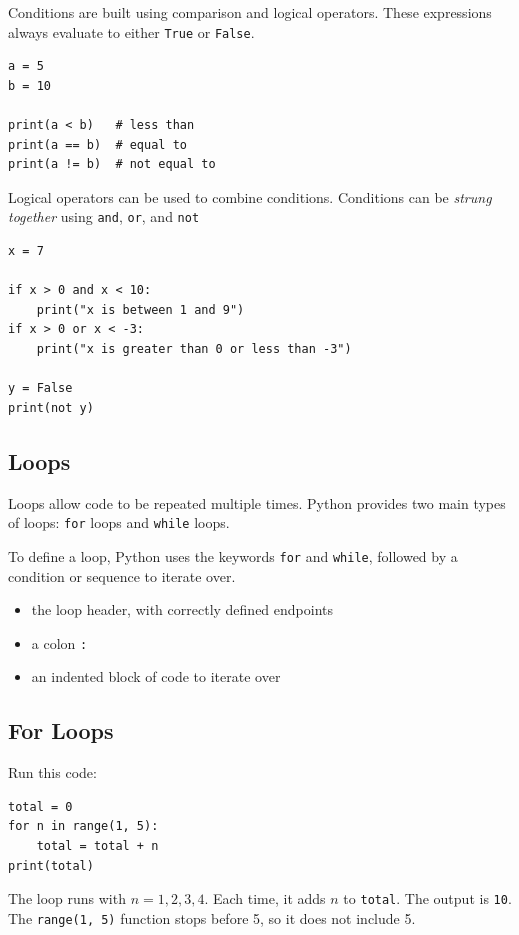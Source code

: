 Conditions are built using comparison and logical operators. These expressions
always evaluate to either \texttt{True} or \texttt{False}.

\begin{verbatim}
a = 5
b = 10

print(a < b)   # less than
print(a == b)  # equal to
print(a != b)  # not equal to
\end{verbatim}

Logical operators can be used to combine conditions. Conditions can be \emph{strung together} using \texttt{and}, \texttt{or}, and \texttt{not}

\begin{verbatim}
x = 7

if x > 0 and x < 10:
    print("x is between 1 and 9")
if x > 0 or x < -3:
    print("x is greater than 0 or less than -3")

y = False
print(not y)

\end{verbatim}

\subsection{Loops}

Loops allow code to be repeated multiple times. Python provides two main types of
loops: \texttt{for} loops and \texttt{while} loops.

To define a loop, Python uses the keywords \texttt{for} and \texttt{while}, followed by a condition or sequence to iterate over.
\begin{itemize}
    \item the loop header, with correctly defined endpoints
    \item a colon \texttt{:}
    \item an indented block of code to iterate over
\end{itemize}
\subsection{For Loops}
\begin{Worked}
\begin{Problem}
Run this code:
\begin{verbatim}
total = 0
for n in range(1, 5):
    total = total + n
print(total)
\end{verbatim}
\end{Problem}
\begin{Solution}
The loop runs with $n = 1, 2, 3, 4$. Each time, it adds $n$ to \texttt{total}. The output is \texttt{10}. The \texttt{range(1, 5)} function stops before 5, so it does not include 5.
\end{Solution}
\end{Worked}

